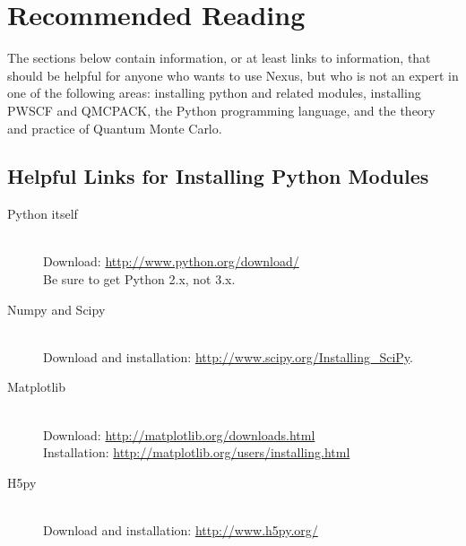 \documentclass[oneside,11pt]{memoir}
\numberwithin{equation}{section}
\newcommand{\bu}[1]{\textbf{\underline{#1}}}
\begin{document}






\pagebreak
\chapter{Recommended Reading} \label{sec:reading}
The sections below contain information, or at least links to information, 
that should be helpful for anyone who wants to use Nexus, but who 
is not an expert in one of the following areas: installing python and related 
modules, installing PWSCF and QMCPACK, the Python programming language, and 
the theory and practice of Quantum Monte Carlo.  


\section{Helpful Links for Installing Python Modules} \label{sec:install_python}
\begin{description}
  \item[Python itself] \hfill \\
    Download: \url{http://www.python.org/download/}\\  
    Be sure to get Python 2.x, not 3.x.
  \item[Numpy and Scipy] \hfill \\
    Download and installation: \url{http://www.scipy.org/Installing_SciPy}.
  \item[Matplotlib] \hfill \\
    Download: \url{http://matplotlib.org/downloads.html}\\
    Installation: \url{http://matplotlib.org/users/installing.html}
  \item[H5py] \hfill \\
    Download and installation: \url{http://www.h5py.org/}
\end{description}
\end{document}
